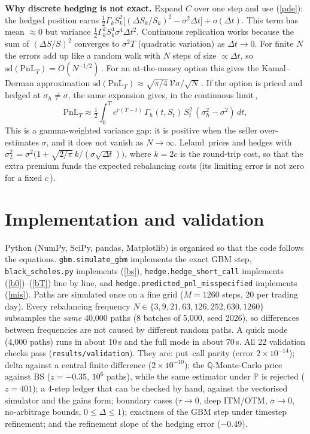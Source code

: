 \documentclass[10pt,a4paper]{article}
\newcommand{\PnL}{\mathrm{PnL}_T}
\begin{document}
\textbf{Why discrete hedging is not exact.} Expand $C$ over one step and use (\ref{pde}): the hedged position earns
$\tfrac12\Gamma_kS_k^2\big[(\Delta S_k/S_k)^2-\sigma^2\Delta t\big]+o(\Delta t)$. This term has mean $\approx0$ but variance
$\tfrac12\Gamma_k^2S_k^4\sigma^4\Delta t^2$. Continuous replication works because the sum of $(\Delta S/S)^2$ converges to
$\sigma^2T$ (quadratic variation) as $\Delta t\to0$. For finite $N$ the errors add up like a random walk with $N$ steps of size $\propto\Delta t$, so
$\mathrm{sd}(\PnL)=O(N^{-1/2})$\,\cite{be}. For an at-the-money option this gives the Kamal--Derman approximation
$\mathrm{sd}(\PnL)\approx\sqrt{\pi/4}\,\mathcal V\sigma/\sqrt N$\,\cite{kd}. If the option is priced and hedged at $\sigma_h\neq\sigma$, the
same expansion gives, in the continuous limit\,\cite{ekjs},
\begin{equation}
\PnL\approx\tfrac12\int_0^T e^{r(T-t)}\,\Gamma_h(t,S_t)\,S_t^2\,(\sigma_h^2-\sigma^2)\,dt ,\label{mis}
\end{equation}
This is a gamma-weighted variance gap: it is positive when the seller over-estimates $\sigma$, and it does not vanish as $N\to\infty$.
Leland\,\cite{leland} prices and hedges with $\sigma_L^2=\sigma^2\big(1+\sqrt{2/\pi}\,k/(\sigma\sqrt{\Delta t})\big)$, where $k=2c$ is the round-trip cost, so that the extra
premium funds the expected rebalancing costs (its limiting error is not zero for a fixed $c$\,\cite{ks}).

\section{Implementation and validation}
Python (NumPy, SciPy, pandas, Matplotlib) is organised so that the code follows the equations.
\texttt{gbm.simulate\_gbm} implements the exact GBM step, \texttt{black\_scholes.py} implements (\ref{bs}), \texttt{hedge.hedge\_short\_call} implements
(\ref{b0})--(\ref{bT}) line by line, and \texttt{hedge.predicted\_pnl\_misspecified} implements (\ref{mis}).
Paths are simulated once on a fine grid ($M=1260$ steps, 20 per trading day). Every rebalancing
frequency $N\in\{3,9,21,63,126,252,630,1260\}$ subsamples the \emph{same} 40{,}000 paths (8 batches of 5{,}000, seed 2026),
so differences between frequencies are not caused by different random paths. A quick mode (4{,}000 paths) runs in about 10\,s and the full mode in about 70\,s.
All 22 validation checks pass (\texttt{results/validation}). They are: put--call parity (error $2\times10^{-14}$); delta against a central
finite difference ($2\times10^{-10}$); the $\mathbb Q$-Monte-Carlo price against BS ($z=-0.35$, $10^6$ paths), while the same estimator under $\mathbb P$
is rejected ($z=401$); a 4-step ledger that can be checked by hand, against the vectorised simulator and the gains form; boundary cases ($\tau\to0$, deep
ITM/OTM, $\sigma\to0$, no-arbitrage bounds, $0\le\Delta\le1$); exactness of the GBM step under timestep refinement; and the refinement slope of the
hedging error ($-0.49$).
\end{document}
